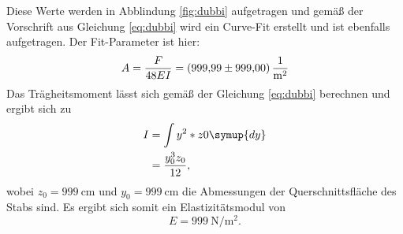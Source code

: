 \noindent Diese Werte werden in Abblindung \ref{fig:dubbi} aufgetragen und gemäß der Vorschrift aus Gleichung \eqref{eq:dubbi} 
wird ein Curve-Fit erstellt und ist ebenfalls aufgetragen.
Der Fit-Parameter ist hier:
\begin{equation}
    A = \frac{F}{48EI} = \SI{999.99\pm999}{\per\meter\squared}
\end{equation}
Das Trägheitsmoment lässt sich gemäß der Gleichung \eqref{eq:dubbi} berechnen und ergibt sich zu
\begin{align}
    I &= \int y^2*z0 \symup{dy} \\
      &= \frac{y_0^3z_0}{12},
\end{align}
wobei $z_0=\SI{999}{\centi\meter}$ und $y_0=\SI{999}{\centi\meter}$ die Abmessungen der Querschnittsfläche des Stabs sind.
Es ergibt sich somit ein Elastizitätsmodul von
\begin{equation}
    E = \SI{999}{\newton\per\meter\squared}.
\end{equation}